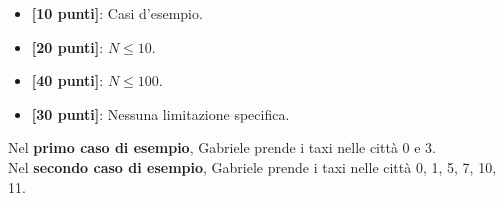 \begin{itemize}[nolistsep,itemsep=2mm]
  \item \textbf{ [10 punti]}: Casi d'esempio.
  \item \textbf{ [20 punti]}: $N \leq 10$.
  \item \textbf{ [40 punti]}: $N \leq 100$.
  \item \textbf{ [30 punti]}: Nessuna limitazione specifica.
\end{itemize}

\Examples
\begin{example}
%
\end{example}
\begin{example}
%
\end{example}


\Explanation
Nel \textbf{primo caso di esempio}, Gabriele prende i taxi nelle città 0 e 3.\\[2mm]
Nel \textbf{secondo caso di esempio}, Gabriele prende i taxi nelle città 0, 1, 5, 7, 10, 11.
